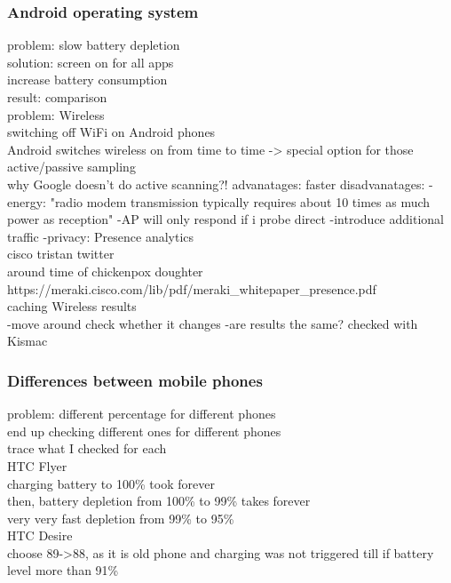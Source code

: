 \subsubsection{Android operating system}
problem: slow battery depletion\\
	solution: screen on for all apps\\
		increase battery consumption\\
	result: comparison\\

problem: Wireless\\
	switching off WiFi on Android phones\\
		Android switches wireless on from time to time -> special option for those \\
		
	active/passive sampling\\
		why Google doesn't do active scanning?!
			advanatages: faster
			disadvanatages: 
				-energy:
					"radio modem transmission typically requires about 10 times as much power as reception"
				-AP will only respond if i probe direct 
				-introduce additional  traffic
				-privacy:
					Presence analytics\\
						cisco tristan twitter\\
							around time of chickenpox doughter\\
							https://meraki.cisco.com/lib/pdf/meraki\_whitepaper\_presence.pdf\\
				
				
	caching Wireless results\\
		-move around check whether it changes
			-are results the same?
		checked with Kismac

\subsubsection{Differences between mobile phones}
problem: different percentage for different phones\\
	end up checking different ones for different phones\\
		trace what I checked for each\\
		HTC Flyer\\
			charging battery to 100\% took forever\\
			then, battery depletion from 100\% to 99\% takes forever\\
			very very fast depletion from 99\% to 95\%\\
		HTC Desire\\
			choose 89->88, as it is old phone and charging was not triggered till if battery level more than 91\%\\
		
